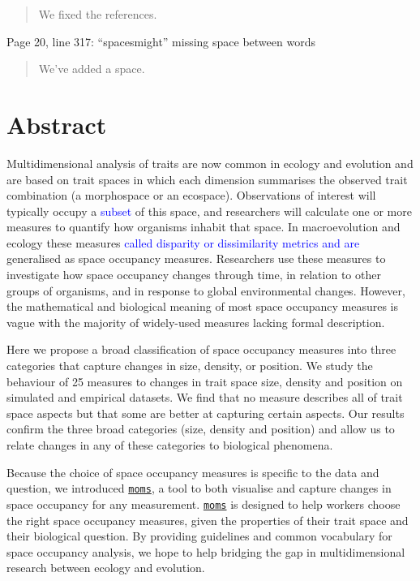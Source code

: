 \documentclass[]{article}
\begin{document}
\begin{quote}
We fixed the references.
\end{quote}

Page 20, line 317: ``spacesmight'' missing space between words

\begin{quote}
We've added a space.
\end{quote}

\modulolinenumbers[1] %
\linenumbers

\section{Abstract}\label{abstract}

Multidimensional analysis of traits are now common in ecology and
evolution and are based on trait spaces in which each dimension
summarises the observed trait combination (a morphospace or an
ecospace). Observations of interest will typically occupy a
\textcolor{blue}{subset} of this space, and
researchers will calculate one or more measures to quantify how
organisms inhabit that space. In macroevolution and ecology these
measures \textcolor{blue}{called disparity or
dissimilarity metrics and are} generalised as space occupancy measures.
Researchers use these measures to investigate how space occupancy
changes through time, in relation to other groups of organisms, and in
response to global environmental changes. However, the mathematical and
biological meaning of most space occupancy measures is vague with the
majority of widely-used measures lacking formal description.

Here we propose a broad classification of space occupancy measures into
three categories that capture changes in size, density, or position. We
study the behaviour of 25 measures to changes in trait space size,
density and position on simulated and empirical datasets. We find that
no measure describes all of trait space aspects but that some are better
at capturing certain aspects. Our results confirm the three broad
categories (size, density and position) and allow us to relate changes
in any of these categories to biological phenomena.

Because the choice of space occupancy measures is specific to the data
and question, we introduced
\href{https://tguillerme.shinyapps.io/moms/}{\texttt{moms}}, a tool to
both visualise and capture changes in space occupancy for any
measurement. \href{https://tguillerme.shinyapps.io/moms/}{\texttt{moms}}
is designed to help workers choose the right space occupancy measures,
given the properties of their trait space and their biological question.
By providing guidelines and common vocabulary for space occupancy
analysis, we hope to help bridging the gap in multidimensional research
between ecology and evolution.
\end{document}
